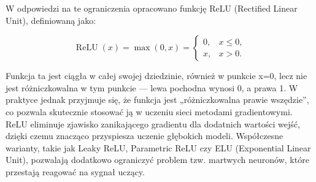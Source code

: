 W odpowiedzi na te ograniczenia opracowano funkcję ReLU (Rectified Linear Unit), definiowaną jako:

\[
\operatorname{ReLU}(x) = \max(0, x) =
\begin{cases}
	0, & x \le 0,\\
	x, & x > 0.
\end{cases}
\]

Funkcja ta jest ciągła w całej swojej dziedzinie, również w punkcie x=0, lecz nie jest różniczkowalna w tym punkcie — lewa pochodna wynosi 0, a prawa 1. W praktyce jednak przyjmuje się, że funkcja jest „różniczkowalna prawie wszędzie”, co pozwala skutecznie stosować ją w uczeniu sieci metodami gradientowymi. ReLU eliminuje zjawisko zanikającego gradientu dla dodatnich wartości wejść, dzięki czemu znacząco przyspiesza uczenie głębokich modeli. Współczesne warianty, takie jak Leaky ReLU, Parametric ReLU czy ELU (Exponential Linear Unit), pozwalają dodatkowo ograniczyć problem tzw. martwych neuronów, które przestają reagować na sygnał uczący.

